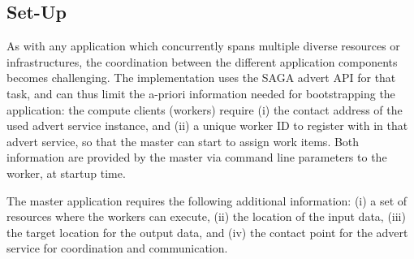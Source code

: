 \documentclass[graybox]{svmult}
\begin{document}
  

\subsection{\sagamapreduce Set-Up}

As with any application which concurrently spans multiple diverse
resources or infrastructures, the coordination between the different
application components becomes challenging.  The \smr implementation
uses the SAGA advert API for that task, and can thus limit the a-priori
information needed for bootstrapping the application: the compute
clients (workers) require (i) the contact address of the used advert
service instance, and (ii) a unique worker ID to register with in that
advert service, so that the master can start to assign work items.
Both information are provided by the master via command line
parameters to the worker, at startup time.

The master application requires the following additional information:
(i) a set of resources where the workers can execute, (ii) the
location of the input data, (iii) the target location for the output
data, and (iv) the contact point for the advert service for
coordination and communication.  
\end{document}
